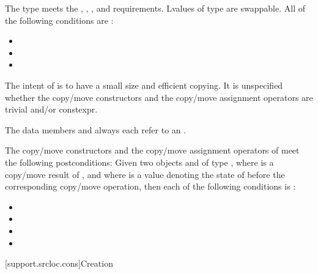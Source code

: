 \pnum
The type  meets the
,
,
, and
requirements.
Lvalues of type 
are swappable.
All of the following conditions are :
\begin{itemize}
\item {}
\item {}
\item {}
\end{itemize}
\begin{note}
The intent of  is
to have a small size and efficient copying.
It is unspecified
whether the copy/move constructors and the copy/move assignment operators
are trivial and/or constexpr.
\end{note}

\pnum
The data members  and 
always each refer to an \ntbs{}.

\pnum
The copy/move constructors and the copy/move assignment operators of
 meet the following postconditions:
Given two objects   and  of type ,
where  is a copy/move result of , and
where  is a value denoting the state of 
before the corresponding copy/move operation,
then each of the following conditions is :
\begin{itemize}
\item {}
\item {}
\item {}
\item {}
\end{itemize}

[support.srcloc.cons]{Creation}

